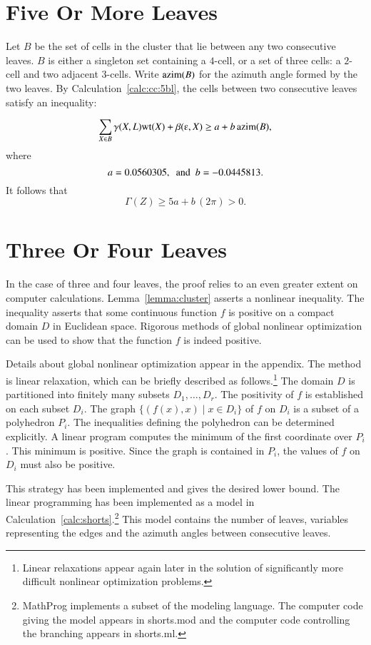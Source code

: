 \section{Five Or More Leaves}

Let $B$ be the set of cells in the cluster that lie between any two
consecutive leaves.  $B$ is either a singleton set containing a
$4$-cell, or a set of three cells: a $2$-cell and two adjacent
$3$-cells.  Write ${\operatorname{azim}}(B)$ for the azimuth angle formed by the
two leaves.  By Calculation~\ref{calc:cc:5bl}, the cells between two
consecutive leaves satisfy an
inequality: %

\[  
\sum_{X\in B} \gamma(X,L)\op{wt}(X) + \beta(\ee,X) \ge a + b\,\op{azim}(B),
\] 
where
\[  
a= 0.0560305, \text{ \ and \ }   b= -0.0445813.
\] 
It follows that
\[  
\Gamma(Z) \ge 5 a + b\, (2\pi) > 0.
\] 

\section{Three Or Four Leaves}\label{sec:3or4}

In the case of three and four leaves, the proof relies to an even
greater extent on computer calculations.  
Lemma~\ref{lemma:cluster} asserts a nonlinear inequality.  The inequality
asserts that some continuous function $f$ is positive on a compact
domain $D$ in Euclidean space.  Rigorous methods of global nonlinear
optimization can be used to show that the function $f$ is indeed
positive.

Details about global nonlinear optimization appear in the appendix.
The method is linear relaxation, which can be briefly described as
follows.\footnote{Linear relaxations appear again later in the
solution of significantly more difficult nonlinear optimization
problems.}  The domain $D$ is partitioned into finitely many subsets
$D_1,\ldots, D_r$.  The positivity of $f$ is established on each
subset $D_i$.  The graph $\{(f(x), x)\mid x\in D_i\}$ of $f$ on $D_i$
is a subset of a polyhedron $P_i$.  The inequalities defining the
polyhedron can be determined explicitly.  A linear program computes
the minimum of the first coordinate over $P_i$.  This minimum is
positive.  Since the graph is contained in $P_i$, the values of $f$ on
$D_i$ must also be positive.

This strategy has been implemented and gives the desired lower bound.
The linear programming has been implemented as a  model
in Calculation~\ref{calc:shorts}.\footnote{MathProg implements a
subset of the  modeling language.  The computer code
giving the model appears in shorts.mod and the computer code
controlling the branching appears in shorts.ml.}  This model
contains the number of leaves, variables representing the edges and
the azimuth angles between consecutive leaves.


